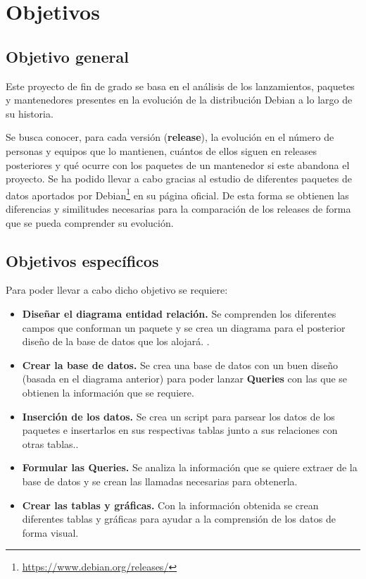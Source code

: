 \documentclass[a4paper, 12pt]{book}
\begin{document}
\cleardoublepage %
\chapter{Objetivos} %
\label{chap:objetivos} %



\section{Objetivo general} %
\label{sec:objetivo-general} %

Este proyecto de fin de grado se basa en el análisis de los lanzamientos, paquetes y mantenedores presentes en la evolución de la distribución Debian a lo largo de su historia. 

Se busca conocer, para cada versión (\textbf{release}), la evolución en el número de personas y equipos que lo mantienen,  cuántos de ellos siguen en releases posteriores y qué ocurre con los paquetes de un mantenedor si este abandona el proyecto. Se ha podido llevar a cabo gracias al estudio de diferentes paquetes de datos aportados por Debian\footnote{\url{https://www.debian.org/releases/}} en su página oficial.
De esta forma se obtienen las diferencias y similitudes necesarias para la comparación de los releases de forma que se pueda comprender su evolución.


\section{Objetivos específicos}
\label{sec:objetivos-especificos}

Para poder llevar a cabo dicho objetivo se requiere: 

\begin{itemize}
	\item \textbf {Diseñar el diagrama entidad relación.} Se comprenden los diferentes campos que conforman un paquete y se crea un diagrama para el posterior diseño de la base de datos que los alojará.
	.
	\item \textbf {Crear la base de datos.} Se crea una base de datos con un buen diseño (basada en el diagrama anterior) para poder lanzar \textbf {Queries} con las que se obtienen la información que se requiere.
	
	\item \textbf {Inserción de los datos.} Se crea un script para parsear los datos de los paquetes e insertarlos en sus respectivas tablas junto a sus relaciones con otras tablas..
	
	\item \textbf {Formular las Queries.} Se analiza la información que se quiere extraer de la base de datos y se crean las llamadas necesarias para obtenerla.
	
	
	\item \textbf {Crear las tablas y gráficas.} Con la información obtenida se crean diferentes tablas y gráficas para ayudar a la comprensión de los datos de forma visual.
\end{itemize}
\end{document}
